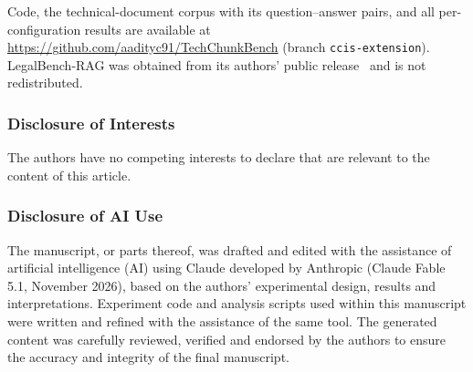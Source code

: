 \documentclass[runningheads]{llncs}
\begin{document}
\begin{credits}
\subsubsection{\ackname}
Code, the technical-document corpus with its question--answer pairs, and all per-configuration results are available at \url{https://github.com/aadityc91/TechChunkBench} (branch \texttt{ccis-extension}). LegalBench-RAG was obtained from its authors' public release~\cite{pipitone2024legalbenchrag} and is not redistributed.

\subsubsection{Disclosure of Interests}
The authors have no competing interests to declare that are relevant to the content of this article.

\subsubsection{Disclosure of AI Use}
The manuscript, or parts thereof, was drafted and edited with the assistance of artificial intelligence (AI) using Claude developed by Anthropic (Claude Fable 5.1, November 2026), based on the authors' experimental design, results and interpretations. Experiment code and analysis scripts used within this manuscript were written and refined with the assistance of the same tool. The generated content was carefully reviewed, verified and endorsed by the authors to ensure the accuracy and integrity of the final manuscript.
\end{credits}



\end{document}
